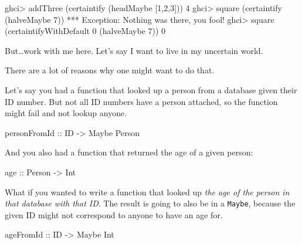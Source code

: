 \documentclass[]{article}
\newenvironment{Shaded}{}{}
\newcommand{\DataTypeTok}[1]{\textcolor[rgb]{0.56,0.13,0.00}{{#1}}}
\newcommand{\DecValTok}[1]{\textcolor[rgb]{0.25,0.63,0.44}{{#1}}}
\newcommand{\OtherTok}[1]{\textcolor[rgb]{0.00,0.44,0.13}{{#1}}}
\newcommand{\FunctionTok}[1]{\textcolor[rgb]{0.02,0.16,0.49}{{#1}}}
\newcommand{\NormalTok}[1]{{#1}}
\begin{document}
\begin{Shaded}
\begin{Highlighting}[]
\NormalTok{ghci}\FunctionTok{>} \NormalTok{addThree (certaintify (headMaybe [}\DecValTok{1}\NormalTok{,}\DecValTok{2}\NormalTok{,}\DecValTok{3}\NormalTok{]))}
\DecValTok{4}
\NormalTok{ghci}\FunctionTok{>} \NormalTok{square (certaintify (halveMaybe }\DecValTok{7}\NormalTok{))}
\FunctionTok{***} \DataTypeTok{Exception}\FunctionTok{:} \DataTypeTok{Nothing} \NormalTok{was there, you fool}\FunctionTok{!}
\NormalTok{ghci}\FunctionTok{>} \NormalTok{square (certaintifyWithDefault }\DecValTok{0} \NormalTok{(halveMaybe }\DecValTok{7}\NormalTok{))}
\DecValTok{0}
\end{Highlighting}
\end{Shaded}

But\ldots{}work with me here. Let's say I want to live in my uncertain world.

There are a lot of reasons why one might want to do that.

Let's say you had a function that looked up a person from a database given their ID number. But not
all ID numbers have a person attached, so the function might fail and not lookup anyone.

\begin{Shaded}
\begin{Highlighting}[]
\OtherTok{personFromId ::} \DataTypeTok{ID} \OtherTok{->} \DataTypeTok{Maybe} \DataTypeTok{Person}
\end{Highlighting}
\end{Shaded}

And you also had a function that returned the age of a given person:

\begin{Shaded}
\begin{Highlighting}[]
\OtherTok{age ::} \DataTypeTok{Person} \OtherTok{->} \DataTypeTok{Int}
\end{Highlighting}
\end{Shaded}

What if you wanted to write a function that looked up \emph{the age of the person in that database
with that ID}. The result is going to also be in a \texttt{Maybe}, because the given ID might not
correspond to anyone to have an age for.

\begin{Shaded}
\begin{Highlighting}[]
\OtherTok{ageFromId ::} \DataTypeTok{ID} \OtherTok{->} \DataTypeTok{Maybe} \DataTypeTok{Int}
\end{Highlighting}
\end{Shaded}
\end{document}
